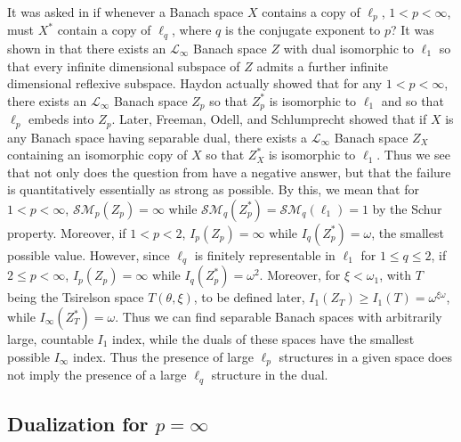 \documentclass[12pt]{amsart}
\theoremstyle{definition}
\newcommand{\ssm}{\mathcal{SM}}
\begin{document}
It was asked in \cite{CS} if whenever a Banach space $X$ contains a copy of $\ell_p$, $1<p<\infty$, must $X^*$ contain a copy of $\ell_q$, where $q$ is the conjugate exponent to $p$? It was shown in \cite{BD} that there exists an $\mathcal{L}_\infty$ Banach space $Z$ with dual isomorphic to $\ell_1$ so that every infinite dimensional subspace of $Z$ admits a further infinite dimensional reflexive subspace.  Haydon \cite{H} actually showed that for any $1<p<\infty$, there exists an $\mathcal{L}_\infty$ Banach space $Z_p$ so that $Z_p^*$ is isomorphic to $\ell_1$ and so that $\ell_p$ embeds into $Z_p$.  Later, Freeman, Odell, and Schlumprecht \cite{FOS} showed that if $X$ is any Banach space having separable dual, there exists a $\mathcal{L}_\infty$ Banach space $Z_X$ containing an isomorphic copy of $X$ so that $Z_X^*$ is isomorphic to $\ell_1$.  Thus we see that not only does the question from \cite{CS} have a negative answer, but that the failure is quantitatively essentially as strong as possible.  By this, we mean that for $1<p<\infty$, $\ssm_p(Z_p)=\infty$ while $\ssm_q(Z_p^*)=\ssm_q(\ell_1)=1$ by the Schur property.  Moreover, if $1<p<2$, $I_p(Z_p)=\infty$ while $I_q(Z_p^*)=\omega$, the smallest possible value.  However, since $\ell_q$ is finitely representable in $\ell_1$ for $1\leqslant q\leqslant 2$, if $2\leqslant p<\infty$, $I_p(Z_p)=\infty$ while $I_q(Z_p^*)=\omega^2$.  Moreover, for $\xi<\omega_1$, with $T$ being the Tsirelson space $T(\theta, \xi)$, to be defined later, $I_1(Z_T)\geqslant I_1(T)= \omega^{\xi\omega}$, while $I_\infty(Z_T^*)=\omega$.  Thus we can find separable Banach spaces with arbitrarily large, countable $I_1$ index, while the duals of these spaces have the smallest possible $I_\infty$ index.  Thus the presence of large $\ell_p$ structures in a given space does not imply the presence of a large $\ell_q$ structure in the dual.  




\subsection{Dualization for $p=\infty$}
\end{document}
